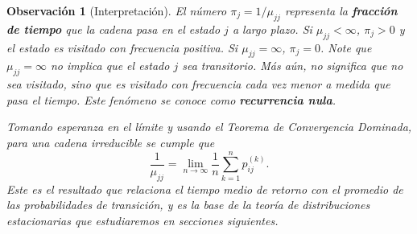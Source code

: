 \documentclass[12pt]{book}
\newtheorem{remark}{Observación}[chapter]
\begin{document}
\begin{remark}[Interpretación]
El número $\pi_j = 1/\mu_{jj}$ representa la \textbf{fracción de tiempo} que la cadena pasa en el estado $j$ a largo plazo. Si $\mu_{jj} < \infty$, $\pi_j > 0$ y el estado es visitado con frecuencia positiva. Si $\mu_{jj} = \infty$, $\pi_j = 0$. Note que $\mu_{jj}=\infty$ no implica que el estado $j$ sea transitorio. Más aún, no significa que no sea visitado, sino que es visitado con frecuencia cada vez menor a medida que pasa el tiempo. Este fenómeno se conoce como \textbf{recurrencia nula}.

Tomando esperanza en el límite y usando el Teorema de Convergencia Dominada, para una cadena irreducible se cumple que
\[
\frac{1}{\mu_{jj}} = \lim_{n \to \infty} \frac{1}{n} \sum_{k=1}^{n} p_{ij}^{(k)}.
\]
Este es el resultado que relaciona el tiempo medio de retorno con el promedio de las probabilidades de transición, y es la base de la teoría de distribuciones estacionarias que estudiaremos en secciones siguientes.
\end{remark}
\end{document}
